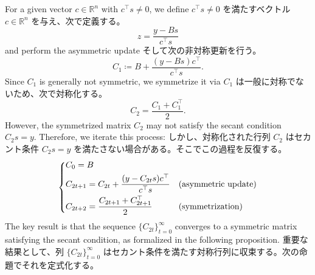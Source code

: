 \documentclass[0_main]{subfiles}
\begin{document}
\ifEn
    For a given vector $c \in \mathbb{R}^n$ with $c^\top s \neq 0$, we define
\else
    $c^\top s \neq 0$ を満たすベクトル $c \in \mathbb{R}^n$ を与え、次で定義する。
\fi
\begin{equation*}
    z = \frac{y - B s}{c^\top s}
\end{equation*}
\ifEn
    and perform the asymmetric update
\else
    そして次の非対称更新を行う。
\fi
\begin{equation*}
    C_1 \coloneqq B + \frac{(y - B s)c^\top}{c^\top s}.
\end{equation*}
\ifEn
    Since $C_1$ is generally not symmetric, we symmetrize it via
\else
    $C_1$ は一般に対称でないため、次で対称化する。
\fi
\begin{equation*}
    C_2 = \frac{C_1 + C_1^\top}{2}.
\end{equation*}
\ifEn
    However, the symmetrized matrix $C_2$ may not satisfy the secant condition $C_2 s = y$. Therefore, we iterate this process:
\else
    しかし、対称化された行列 $C_2$ はセカント条件 $C_2 s = y$ を満たさない場合がある。そこでこの過程を反復する。
\fi
\begin{equation*}
    \begin{dcases}
        C_0 = B                                                                               \\
        C_{2t+1} = C_{2t} + \frac{(y - C_{2t}s)c^\top}{c^\top s} & \text{(asymmetric update)} \\
        C_{2t+2} = \frac{C_{2t+1} + C_{2t+1}^\top}{2}            & \text{(symmetrization)}
    \end{dcases}
\end{equation*}
\ifEn
    The key result is that the sequence $\{ C_{2t} \}_{t=0}^{\infty}$ converges to a symmetric matrix satisfying the secant condition, as formalized in the following proposition.
\else
    重要な結果として、列 $\{ C_{2t} \}_{t=0}^{\infty}$ はセカント条件を満たす対称行列に収束する。次の命題でそれを定式化する。
\fi
\end{document}
